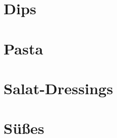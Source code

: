 \documentclass[
  DIV=11,%
  pagesize,%
  fontsize=11pt,%
  paper=a4,%
  numbers=noenddot,
]{scrartcl}
\begin{document}
\section{Dips}
\newpage

\section{Pasta}
\newpage
\newpage

\section{Salat-Dressings}
\newpage

\section{Süßes}
\newpage
\newpage
\newpage
\newpage
\newpage
\end{document}

